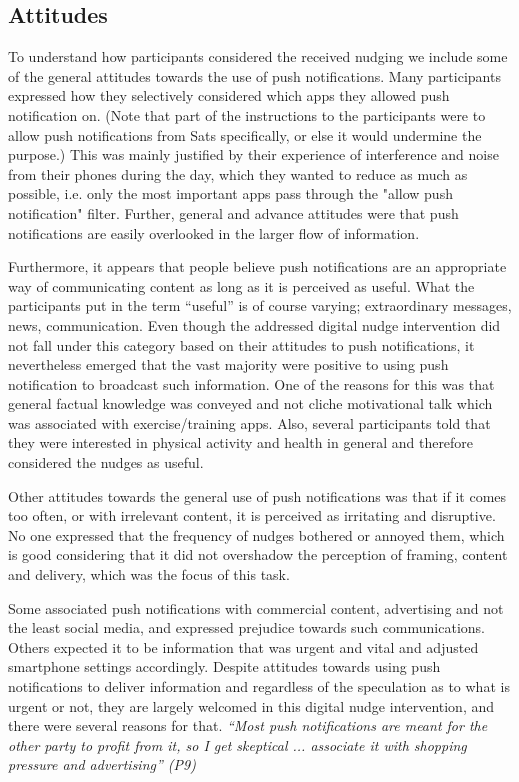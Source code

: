 \subsection{Attitudes}
To understand how participants considered the received nudging we include some of the general attitudes towards the use of push notifications. Many participants expressed how they selectively considered which apps they allowed push notification on. (Note that part of the instructions to the participants were to allow push notifications from Sats specifically, or else it would undermine the purpose.) This was mainly justified by their experience of interference and noise from their phones during the day, which they wanted to reduce as much as possible, i.e. only the most important apps pass through the "allow push notification" filter. Further, general and advance attitudes were that push notifications are easily overlooked in the larger flow of information. 

Furthermore, it appears that people believe push notifications are an appropriate way of communicating content as long as it is perceived as useful. What the participants put in the term “useful” is of course varying; extraordinary messages, news, communication. Even though the addressed digital nudge intervention did not fall under this category based on their attitudes to push notifications, it nevertheless emerged that the vast majority were positive to using push notification to broadcast such information. One of the reasons for this was that general factual knowledge was conveyed and not cliche motivational talk which was associated with exercise/training apps. Also, several participants told that they were interested in physical activity and health in general and therefore considered the nudges as useful. 

Other attitudes towards the general use of push notifications was that if it comes too often, or with irrelevant content, it is perceived as irritating and disruptive. No one expressed that the frequency of nudges bothered or annoyed them, which is good considering that it did not overshadow the perception of framing, content and delivery, which was the focus of this task.

Some associated push notifications with commercial content, advertising and not the least social media, and expressed prejudice towards such communications. Others expected it to be information that was urgent and vital and adjusted smartphone settings accordingly. Despite attitudes towards using push notifications to deliver information and regardless of the speculation as to what is urgent or not, they are largely welcomed in this digital nudge intervention, and there were several reasons for that. \textit{“Most push notifications are meant for the other party to profit from it, so I get skeptical ... associate it with shopping pressure and advertising” (P9)}

